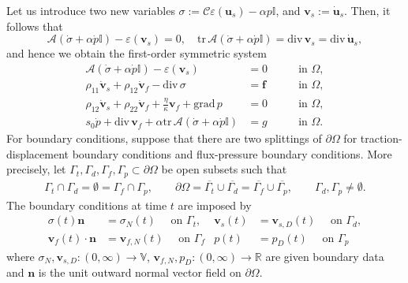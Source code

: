 \documentclass[10pt,letterpaper]{amsart}
\theoremstyle{plain} %
\theoremstyle{remark} %
\newcommand{\vect}[1]{\mathbf{#1}}
\newcommand{\divergence}{\mathrm{div}\,}
\newcommand{\tr}{\mathrm{tr}\,}
\newcommand{\grad}{\mathrm{grad}\,}
\newcommand{\Id}{\mathbb{I}} %
\newcommand{\Cel}{\mathcal{C}} %
\newcommand{\Ael}{\mathcal{A}} %
\begin{document}
Let us introduce two new variables \(\sigma := \Cel \varepsilon(\vect{u}_{s}) - \alpha p \Id\), and \(\vect{v}_{s}:=\dot{\vect{u}}_{s} .\) Then, it follows that 
%
\[
\Ael(\dot{\sigma} + \alpha \dot{p} \Id) - \varepsilon(\vect{v}_{s}) = 0, \quad \tr \Ael(\dot{\sigma} + \alpha \dot{p} \Id) = \divergence \vect{v}_{s} = \divergence \dot{\vect{u}}_{s},
\]
%
and hence we obtain the first-order symmetric system
%
\begin{subequations}\label{eq:1stordersystem}
	\begin{alignat}{4}
		\Ael(\dot{\sigma} + \alpha \dot{p} \Id) - \varepsilon(\vect{v}_{s}) &= 0&\qquad \text{in }\Omega,\\
		\rho_{11} \dot{\vect{v}}_{s} + \rho_{12} \dot{\vect{v}}_{f} - \divergence \sigma & = \vect{f}&\qquad \text{in }\Omega,\\
		\rho_{12} \dot{\vect{v}}_{s} + \rho_{22} \dot{\vect{v}}_{f} + \frac{\eta}{\kappa} \vect{v}_{f} + \grad p & = 0&\qquad \text{in }\Omega,\\
		s_{0} \dot{p} + \divergence \vect{v}_{f} + \alpha \tr {\Ael}(\dot{\sigma} + \alpha \dot{p} \Id)  & = g&\qquad \text{in }\Omega.
	\end{alignat}
\end{subequations}
%
For boundary conditions, suppose that there are two splittings of $\partial \Omega$ for traction-displacement boundary conditions and flux-pressure boundary conditions. More precisely, let $\Gamma_t, \Gamma_d, \Gamma_f, \Gamma_p \subset \partial \Omega$ be open subsets such that 
%
\begin{align*}
	\Gamma_t \cap \Gamma_d = \emptyset = \Gamma_f \cap \Gamma_p , \qquad 
	\partial \Omega = \overline{\Gamma_t} \cup \overline{\Gamma_d} = \overline{\Gamma_f} \cup \overline{\Gamma_p} , \qquad \Gamma_d, \Gamma_p \not = \emptyset.
\end{align*}
%
The boundary conditions at time $t$ are imposed by 
%
\begin{subequations}    
	\label{eq:boundary-conditions}
	\begin{align}
		\label{eq:boundary-condition1}
		\sigma(t) \vect{n} &= \sigma_{N}(t) \quad \text{ on } \Gamma_t, & \vect{v}_{s}(t) &= \vect{v}_{s,D}(t) \quad \text{ on } \Gamma_d, 
		\\
		\label{eq:boundary-condition2}
		\vect{v}_f(t) \cdot \vect{n} &= \vect{v}_{f,N}(t) \quad \text{ on } \Gamma_f & p(t) &= p_D(t) \quad \text{ on } \Gamma_p 
	\end{align}
\end{subequations}
%
where $\sigma_N,\vect{v}_{s,D}:(0,\infty) \to \mathbb{V}$, $\vect{v}_{f,N}, p_D: (0,\infty) \to \mathbb{R}$ are given boundary data and $\vect{n}$ is the unit outward normal vector field on $\partial \Omega$. 
\end{document}
